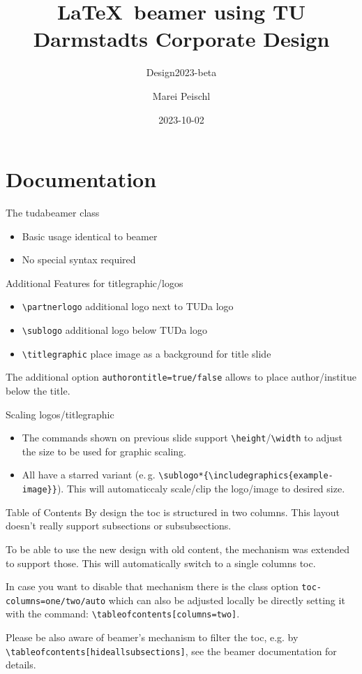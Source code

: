 \documentclass[
	english, %
	design=2023, %
	]{tudabeamer}
\title[TUDaBeamer2023]{\LaTeX~beamer using TU Darmstadts Corporate Design}
\subtitle{Design2023-beta}
\author[M. Peischl]{Marei Peischl}
\institute{pei\TeX}
\date{2023-10-02}
\newcommand*{\code}[1]{\texttt{#1}}
\begin{document}
\maketitle

\tableofcontents

\section{Documentation}
\sectionpage

\begin{frame}{The tudabeamer class}
\begin{itemize}
	\item Basic usage identical to beamer
	\item No special syntax required
\end{itemize}
\end{frame}

\begin{frame}{Additional Features for titlegraphic/logos}
\begin{itemize}
	\item \code{\textbackslash{}partnerlogo} additional logo next to TUDa logo
	\item \code{\textbackslash{}sublogo} additional logo below TUDa logo
	\item \code{\textbackslash{}titlegraphic} place image as a background for title slide
\end{itemize}
	The additional option \code{authorontitle=true/false} allows to place author/institue below the title.
\end{frame}

\begin{frame}{Scaling logos/titlegraphic}
\begin{itemize}
\item The commands shown on previous slide support \code{\textbackslash{}height}/\code{\textbackslash{}width} to adjust the size to be used for graphic scaling.
\item All have a starred variant (e.\,g. \code{\textbackslash{}sublogo*\{\textbackslash{}includegraphics\{example-image\}\}}). This will automaticcaly scale/clip the logo/image to desired size.
\end{itemize}
\end{frame}

\begin{frame}{Table of Contents}
By design the toc is structured in two columns. This layout doesn't really support subsections or subsubsections.

To be able to use the new design with old content, the mechanism was extended to support those. This will automatically switch to a single columns toc.

In case you want to disable that mechanism there is the class option \code{toc-columns=one/two/auto} which can also be adjusted locally be directly setting it with the command: \code{\textbackslash{}tableofcontents[columns=two]}.

Please be also aware of beamer's mechanism to filter the toc, e.g. by \code{\textbackslash{}tableofcontents[hideallsubsections]}, see the beamer documentation for details.
\end{frame}
\end{document}
